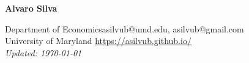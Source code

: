 \documentclass[10pt]{article}
\begin{document}
\begin{center}
\begin{Large} \bfseries Alvaro Silva\end{Large}
\end{center}


\vspace*{0.2in}
Department of Economics\hfill asilvub@umd.edu, asilvub@gmail.com \\
University of Maryland \hfill \href{https://asilvub.github.io/}{https://asilvub.github.io/} \\
\hfill \emph{Updated: \today}\\


\end{document}
